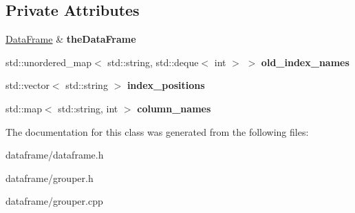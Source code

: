 \subsection*{Private Attributes}
\begin{DoxyCompactItemize}
\item 
\mbox{\label{classDataFrame_1_1Grouper_a145dbdc7827d0d4ccdbbcf5ed7efb413}} 
\hyperlink{classDataFrame}{Data\+Frame} \& {\bfseries the\+Data\+Frame}
\item 
\mbox{\label{classDataFrame_1_1Grouper_a1b17c37868718cfbbf5f1f24a35b6b77}} 
std\+::unordered\+\_\+map$<$ std\+::string, std\+::deque$<$ int $>$ $>$ {\bfseries old\+\_\+index\+\_\+names}
\item 
\mbox{\label{classDataFrame_1_1Grouper_a87e56749cb1af1156a905dde5cc76f63}} 
std\+::vector$<$ std\+::string $>$ {\bfseries index\+\_\+positions}
\item 
\mbox{\label{classDataFrame_1_1Grouper_a1234cff8d2ca6a76c52e6390216215d1}} 
std\+::map$<$ std\+::string, int $>$ {\bfseries column\+\_\+names}
\end{DoxyCompactItemize}


The documentation for this class was generated from the following files\+:\begin{DoxyCompactItemize}
\item 
dataframe/dataframe.\+h\item 
dataframe/grouper.\+h\item 
dataframe/grouper.\+cpp\end{DoxyCompactItemize}

